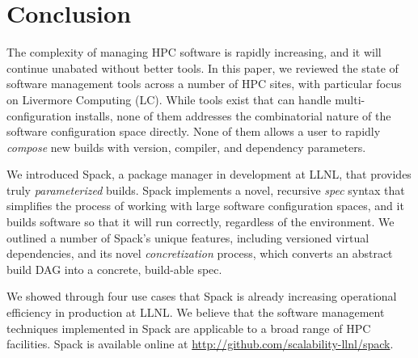 
\section{Conclusion}
\label{sec:conclusion}


The complexity of managing HPC software is rapidly increasing, and it
will continue unabated without better tools.
In this paper, we reviewed the state of software management tools
across a number of HPC sites, with particular focus on Livermore
Computing (LC). While tools exist that can handle multi-configuration
installs, none of them addresses the combinatorial nature
of the software configuration space directly. None of them allows
a user to rapidly {\it compose} new builds with version, compiler,
and dependency parameters.

We introduced Spack, a package manager in development at LLNL, that
provides truly {\it parameterized} builds.  Spack implements
a novel, recursive {\it spec} syntax that simplifies the process of working
with large software configuration spaces, and it builds software
so that it will run correctly, regardless of the environment.
We outlined a number of Spack's unique features, including
versioned virtual dependencies, and its novel {\it concretization}
process, which converts an abstract build DAG into a concrete,
build-able spec.

We showed through four use cases that Spack is already increasing
operational efficiency in production at LLNL.  We believe that the
software management techniques implemented in Spack are applicable
to a broad range of HPC facilities.
Spack is available online at \url{http://github.com/scalability-llnl/spack}.
